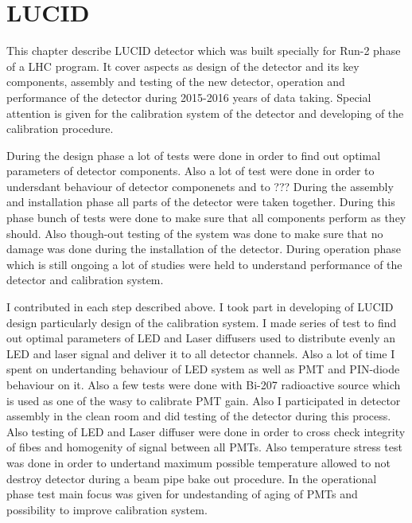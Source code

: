 \chapter{LUCID}
\label{chap:LUCID}


This chapter describe LUCID detector which was built specially for Run-2 phase of a LHC program.
It cover aspects as design of the detector and its key components, assembly and testing of the new detector, 
operation and performance of the detector during 2015-2016 years of data taking.
Special attention is given for the calibration system of the detector and developing of the calibration procedure.

During the design phase a lot of tests were done in order to find out optimal parameters of detector components.
Also a lot of test were done in order to undersdant behaviour of detector componenets and to ???
During the assembly and installation phase all parts of the detector were taken together. During this phase bunch of tests were done
to make sure that all components perform as they should.
Also though-out testing of the system was done to make sure that no damage was done during the installation of the detector.
During operation phase which is still ongoing a lot of studies were held to understand performance of the detector and calibration system.

I contributed in each step described above. I took part in developing of LUCID design particularly design of the calibration system. 
I made series of test to find out optimal parameters of LED and Laser diffusers used to distribute evenly an LED and laser signal and deliver it to all detector channels.
Also a lot of time I spent on undertanding behaviour of LED system as well as PMT and PIN-diode behaviour on it.
Also a few tests were done with Bi-207 radioactive source which is used as one of the wasy to calibrate PMT gain.
Also I participated in detector assembly in the clean room and did testing of the detector during this process.
Also testing of LED and Laser diffuser were done in order to cross check integrity of fibes and homogenity of signal between all PMTs.
Also temperature stress test was done in order to undertand maximum possible temperature allowed to not destroy detector during a beam pipe bake out procedure.
In the operational phase test main focus was given for undestanding of aging of PMTs and possibility to improve calibration system.

